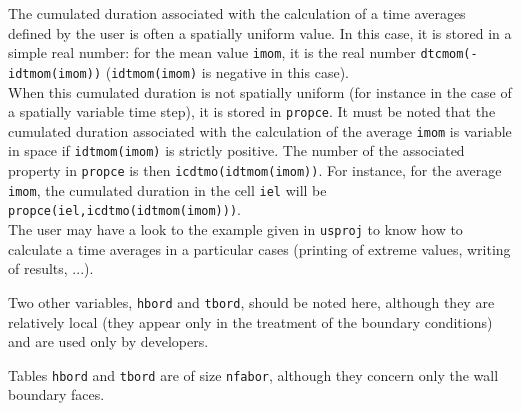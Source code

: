 {{{\label{prg_moyennes}
The cumulated duration associated with the calculation of a time averages
defined by the user is often a spatially uniform value. In this case, it
is stored in a simple real number: for the mean value \texttt{imom}, it is the
real number \texttt{dtcmom(-idtmom(imom))}%
 (\texttt{idtmom(imom)} is negative in this case).\\
When this cumulated duration is not spatially uniform (for instance in the case
of a spatially variable time step), it is stored in \texttt{propce}. It must be
noted that the cumulated duration associated with the calculation of
the average \texttt{imom} is variable in space if \texttt{idtmom(imom)} is strictly
positive. The number of the associated property in \texttt{propce} is then
\texttt{icdtmo(idtmom(imom))}. For instance, for the
average \texttt{imom}, the cumulated duration in the cell \texttt{iel} will be
\texttt{propce(iel,icdtmo(idtmom(imom)))}.\\
The user may have a look to the example given in \texttt{usproj} to know
how to calculate a time averages in a particular cases (printing of extreme
values, writing of results, ...).

\bigskip

Two other variables, \texttt{hbord} and \texttt{tbord}, should be noted here,
although they are relatively local (they appear only in the treatment of the
boundary conditions) and are used only by developers.



Tables \texttt{hbord} and \texttt{tbord} are of size \texttt{nfabor},
although they concern only the wall boundary faces.


}}}
